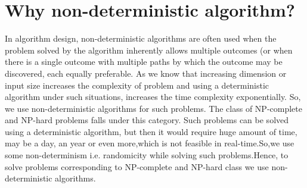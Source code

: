 \section{Why non-deterministic algorithm?}In algorithm design, non-deterministic algorithms are often used when the problem solved by the algorithm inherently allows multiple outcomes (or when there is a single outcome with multiple paths by which the outcome may be discovered, each equally preferable.
As we know that increasing dimension or input size increases the complexity of problem and using a deterministic algorithm under such situations, increases the time complexity exponentially. So, we use non-deterministic algorithms for such problems. The class of NP-complete and NP-hard problems falls under this category. Such problems can be solved using a deterministic algorithm, but then it would require huge amount of time, may be a day, an year or even more,which is not feasible in real-time.So,we use some non-determinism i.e. randomicity while solving such problems.Hence, to solve problems corresponding to NP-complete and NP-hard class we use non-deterministic algorithms.\\